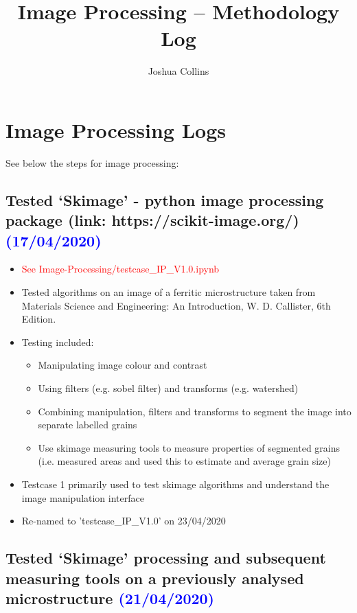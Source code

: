 \documentclass{article}
\title{Image Processing – Methodology Log}
\author{Joshua Collins}
\begin{document}
\maketitle

\section{Image Processing Logs}

See below the steps for image processing:

\subsection{Tested ‘Skimage’ - python image processing package (link: https://scikit-image.org/)  \textcolor{blue}{(17/04/2020)}}

\begin{itemize}
\item \textcolor{red}{See Image-Processing/testcase\_IP\_V1.0.ipynb}
\item Tested algorithms on an image of a ferritic microstructure taken from Materials Science and Engineering: An Introduction, W. D. Callister, 6th Edition.
\item Testing included:
\begin{itemize}
\item Manipulating image colour and contrast
\item Using filters (e.g. sobel filter) and transforms (e.g. watershed)
\item Combining manipulation, filters and transforms to segment the image into separate labelled grains
\item Use skimage measuring tools to measure properties of segmented grains (i.e. measured areas and used this to estimate and average grain size)
\end{itemize}
\item Testcase 1 primarily used to test skimage algorithms and understand the image manipulation interface
\item Re-named to 'testcase\_IP\_V1.0' on 23/04/2020
\end{itemize}

\subsection{Tested ‘Skimage’ processing and subsequent measuring tools on a previously analysed microstructure \textcolor{blue}{(21/04/2020)}}
\end{document}
